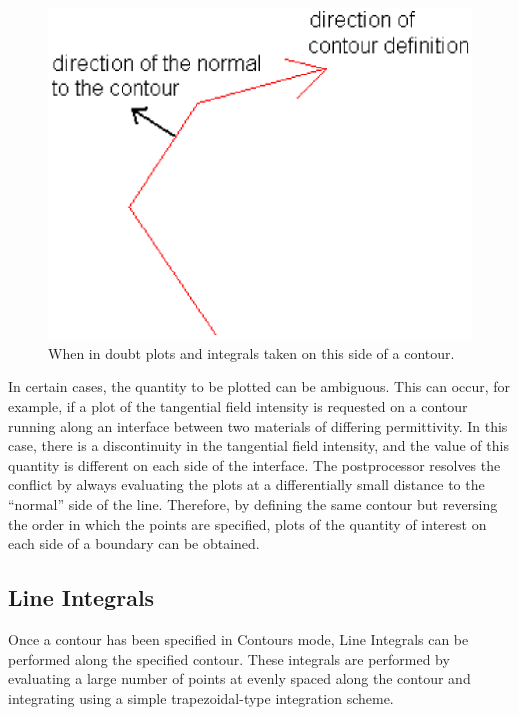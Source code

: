 \documentclass[12pt]{report}
\begin{document}
\begin{figure}[htbp]
\centerline{\includegraphics{belaman20.eps}}
\caption{When in doubt plots and integrals taken on this side of a contour.}
\label{fig20}
\end{figure}




In certain cases, the quantity to be plotted can be ambiguous. This
can occur, for example, if a plot of the tangential field intensity
is requested on a contour running along an interface between two
materials of differing permittivity. In this case, there is a
discontinuity in the tangential field intensity, and the value of
this quantity is different on each side of the interface. The
postprocessor resolves the conflict by always evaluating the plots
at a differentially small distance to the ``normal'' side of the
line. Therefore, by defining the same contour but reversing the
order in which the points are specified, plots of the quantity of
interest on each side of a boundary can be obtained.

\subsection{Line Integrals}

Once a contour has been specified in Contours mode, Line Integrals can be
performed along the specified contour. These integrals are performed by
evaluating a large number of points at evenly spaced along the contour and
integrating using a simple trapezoidal-type integration scheme.
\end{document}
